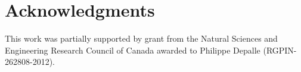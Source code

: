 \documentclass[twoside,a4paper]{article}
\begin{document}
\section{Acknowledgments}
This work was partially supported by grant from the Natural Sciences and Engineering Research Council of Canada awarded to Philippe Depalle (RGPIN-262808-2012).



\end{document}
